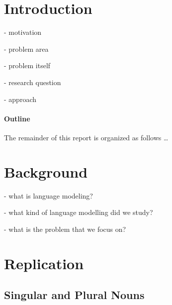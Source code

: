 \documentclass[twoside]{article}
\begin{document}
\begin{multicols}{2} %

\section{Introduction}
- motivation

- problem area

- problem itself

- research question

- approach

\paragraph{Outline}
The remainder of this report is organized as follows \ldots



\section{Background}
\label{background}

- what is language modeling?

- what kind of language modelling did we study?

- what is the problem that we focus on?









\section{Replication}
\label{replication}

\subsection{Singular and Plural Nouns}


\end{multicols}
\end{document}
